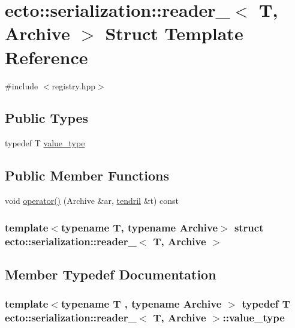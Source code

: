 \hypertarget{structecto_1_1serialization_1_1reader__}{\section{ecto\-:\-:serialization\-:\-:reader\-\_\-$<$ \-T, \-Archive $>$ \-Struct \-Template \-Reference}
\label{structecto_1_1serialization_1_1reader__}
}


{\ttfamily \#include $<$registry.\-hpp$>$}

\subsection*{\-Public \-Types}
\begin{DoxyCompactItemize}
\item 
typedef \-T \hyperlink{structecto_1_1serialization_1_1reader___a8dfc44aa7e7f689b932720efb9ac541a}{value\-\_\-type}
\end{DoxyCompactItemize}
\subsection*{\-Public \-Member \-Functions}
\begin{DoxyCompactItemize}
\item 
void \hyperlink{structecto_1_1serialization_1_1reader___aff0b5af9cb0ab1c83872367ffe595e04}{operator()} (\-Archive \&ar, \hyperlink{classecto_1_1tendril}{tendril} \&t) const 
\end{DoxyCompactItemize}
\subsubsection*{template$<$typename T, typename Archive$>$ struct ecto\-::serialization\-::reader\-\_\-$<$ T, Archive $>$}



\subsection{\-Member \-Typedef \-Documentation}
\hypertarget{structecto_1_1serialization_1_1reader___a8dfc44aa7e7f689b932720efb9ac541a}{
\subsubsection[{value\-\_\-type}]{\setlength{\rightskip}{0pt plus 5cm}template$<$typename T , typename Archive $>$ typedef \-T {\bf ecto\-::serialization\-::reader\-\_\-}$<$ \-T, \-Archive $>$\-::{\bf value\-\_\-type}}}\label{structecto_1_1serialization_1_1reader___a8dfc44aa7e7f689b932720efb9ac541a}



